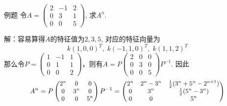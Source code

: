 \begin{frame}

\begin{block}{例题}
令$A = \begin{pmatrix} 2 & -1 & 2 \\ 0 & 3 & 1 \\ 0 & 0 & 5 \end{pmatrix}$, 求$A^{n}$.

\vspace{1em}
\pause

解：容易算得$A$的特征值为$2, 3, 5$, 对应的特征向量为\[k(1,0,0)^T, \; k(-1,1,0)^T, \; k(1,1,2)^T\]
那么令$P=\begin{pmatrix} 1 & -1 & 1 \\ 0 & 1 & 1 \\ 0 & 0 & 2 \end{pmatrix}$，则有$A = P \begin{pmatrix} 2 & 0 & 0 \\ 0 & 3 & 0 \\ 0 & 0 & 5 \end{pmatrix} P^{-1}$.
因此
\begin{equation*}
\small
A^{n} = P \begin{pmatrix} 2^{n} & 0 & 0 \\ 0 & 3^{n} & 0 \\ 0 & 0 & 5^{n} \end{pmatrix} P^{-1} = \begin{pmatrix} 2^{n} & 2^n-3^n & \frac{1}{2}(3^n+5^n-2^{n+1}) \\ 0 & 3^n & \frac{1}{2}(5^n-3^n) \\ 0 & 0 & 5^n \end{pmatrix}
\end{equation*}
\end{block}

\end{frame}




